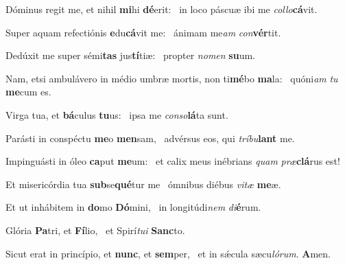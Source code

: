 \item Dóminus regit me, et nihil \textbf{mi}hi \textbf{dé}erit:~\psstar{} in loco páscuæ ibi me \textit{collo}\textbf{cá}vit.
\item Super aquam refectiónis \textbf{e}du\textbf{cá}vit me:~\psstar{} ánimam me\textit{am} \textit{con}\textbf{vér}tit.
\item Dedúxit me super sémi\textbf{tas} jus\textbf{tí}tiæ:~\psstar{} propter \textit{nomen} \textbf{su}um.
\item Nam, etsi ambulávero in médio umbræ mortis, non ti\textbf{mé}bo \textbf{ma}la:~\psstar{} quóni\textit{am} \textit{tu} \textbf{me}cum es.
\item Virga tua, et \textbf{bá}culus \textbf{tu}us:~\psstar{} ipsa me \textit{conso}\textbf{lá}ta sunt.
\item Parásti in conspéctu \textbf{me}o \textbf{men}sam,~\psstar{} advérsus eos, qui \textit{tríbu}\textbf{lant} me.
\item Impinguásti in óleo \textbf{ca}put \textbf{me}um:~\psstar{} et calix meus inébrians \textit{quam} \textit{præ}\textbf{clá}rus est!
\item Et misericórdia tua \textbf{sub}se\textbf{qué}\-tur me~\psstar{} ómnibus diébus \textit{vitæ} \textbf{me}æ.
\item Et ut inhábitem in \textbf{do}mo \textbf{Dó}mini,~\psstar{} in longitúdi\textit{nem} \textit{di}\textbf{é}rum.
\item Glória \textbf{Pa}tri, et \textbf{Fí}lio,~\psstar{} et Spirí\textit{tui} \textbf{Sanc}to.
\item Sicut erat in princípio, et \textbf{nunc}, et \textbf{sem}per,~\psstar{} et in sǽcula sæcu\textit{lórum}. \textbf{A}men.
